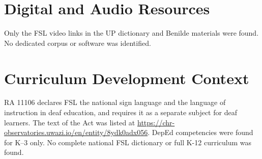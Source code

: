 \documentclass[12pt]{article}
\begin{document}
\section{Digital and Audio Resources}
Only the FSL video links in the UP dictionary and Benilde materials were found. No dedicated corpus or software was identified.

\section{Curriculum Development Context}
RA 11106 declares FSL the national sign language and the language of instruction in deaf education, and requires it as a separate subject for deaf learners. The text of the Act was listed at \url{https://chr-observatories.uwazi.io/en/entity/8ydk0adx056}. DepEd competencies were found for K--3 only. No complete national FSL dictionary or full K-12 curriculum was found.
\end{document}
